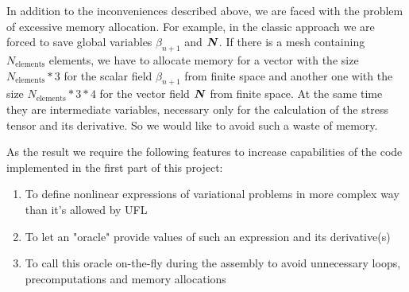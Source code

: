 \documentclass[12pt]{article}
\newcommand{\todounderline}[1]{\todo[inline, size=\scriptsize]{#1}}
\begin{document}

In addition to the inconveniences described above, we are faced with the problem of excessive memory allocation. For example, in the classic approach we are forced to save global variables $\beta_{n+1}$ and $\mbox{\boldmath $N$}$. If there is a mesh containing $N_\text{elements}$ elements, we have to allocate memory for a vector with the size $N_\text{elements}*3$ for the scalar field $\beta_{n+1}$ from  finite space and another one with the size $N_\text{elements}*3*4$ for the vector field $\mbox{\boldmath $N$}$ from  finite space. At the same time they are intermediate variables, necessary only for the calculation of the stress tensor and its derivative. So we would like to avoid such a waste of memory.




As the result we require the following features to increase capabilities of the code implemented in the first part of this project:
\begin{enumerate}
    \item To define nonlinear expressions of variational problems in more complex way than it's allowed by UFL
    \item To let an "oracle" provide values of such an expression and its derivative(s)
    \item To call this oracle on-the-fly during the assembly to avoid unnecessary loops, precomputations and memory allocations
\end{enumerate}
\end{document}
